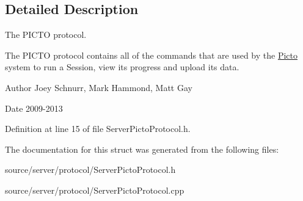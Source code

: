 \subsection{Detailed Description}
The P\-I\-C\-T\-O protocol. 

The P\-I\-C\-T\-O protocol contains all of the commands that are used by the \hyperlink{namespace_picto}{Picto} system to run a Session, view its progress and upload its data. \begin{DoxyAuthor}{Author}
Joey Schnurr, Mark Hammond, Matt Gay 
\end{DoxyAuthor}
\begin{DoxyDate}{Date}
2009-\/2013 
\end{DoxyDate}


Definition at line 15 of file Server\-Picto\-Protocol.\-h.



The documentation for this struct was generated from the following files\-:\begin{DoxyCompactItemize}
\item 
source/server/protocol/Server\-Picto\-Protocol.\-h\item 
source/server/protocol/Server\-Picto\-Protocol.\-cpp\end{DoxyCompactItemize}
